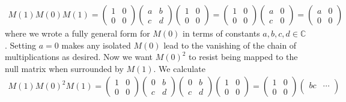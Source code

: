 \documentclass[10pt, a4paper]{article}
\begin{document}
{\begin{enumerate}
  \begin{align*}
    M(1) M(0) M(1) = 
    \begin{pmatrix}
      1&0\\
      0&0
    \end{pmatrix}
    \begin{pmatrix}
      a&b\\
      c&d
    \end{pmatrix}
    \begin{pmatrix}
      1&0\\
      0&0
    \end{pmatrix}
    =
    \begin{pmatrix}
      1&0\\
      0&0
    \end{pmatrix}
    \begin{pmatrix}
      a&0\\
      c&0
    \end{pmatrix}
    =
    \begin{pmatrix}
      a&0\\
      0&0
    \end{pmatrix}
  \end{align*}
  where we wrote a fully general form for $M(0)$ in terms of constants $a, b, c, d\in\mathbb{C}$. Setting $a = 0$ makes any isolated $M(0)$ lead to the vanishing of the chain of multiplications as desired. Now we want $M(0)^2$ to resist being mapped to the null matrix when surrounded by $M(1)$. We calculate 
  \begin{align*}
    M(1) M(0)^2 M(1) = 
    \begin{pmatrix}
      1&0\\
      0&0
    \end{pmatrix}
    \begin{pmatrix}
      0&b\\
      c&d
    \end{pmatrix}
    \begin{pmatrix}
      0&b\\
      c&d
    \end{pmatrix}
    \begin{pmatrix}
      1&0\\
      0&0
    \end{pmatrix}= 
    \begin{pmatrix}
      1&0\\
      0&0
    \end{pmatrix}
    \begin{pmatrix}
      bc&\cdots\\

\end{pmatrix}
\end{align*}
\end{enumerate}}
\end{document}
